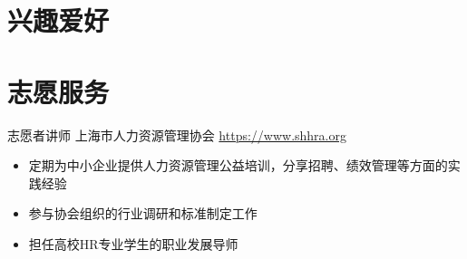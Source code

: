 \documentclass[a4paper, serif, 10pt]{moderncv}
\begin{document}
\section{兴趣爱好}

\section{志愿服务}

        {志愿者讲师}
        {上海市人力资源管理协会}
        {\url{https://www.shhra.org}}
        {}
        {\begin{itemize}
\item 定期为中小企业提供人力资源管理公益培训，分享招聘、绩效管理等方面的实践经验
\item 参与协会组织的行业调研和标准制定工作
\item 担任高校HR专业学生的职业发展导师
\end{itemize}}
    
\end{document}

